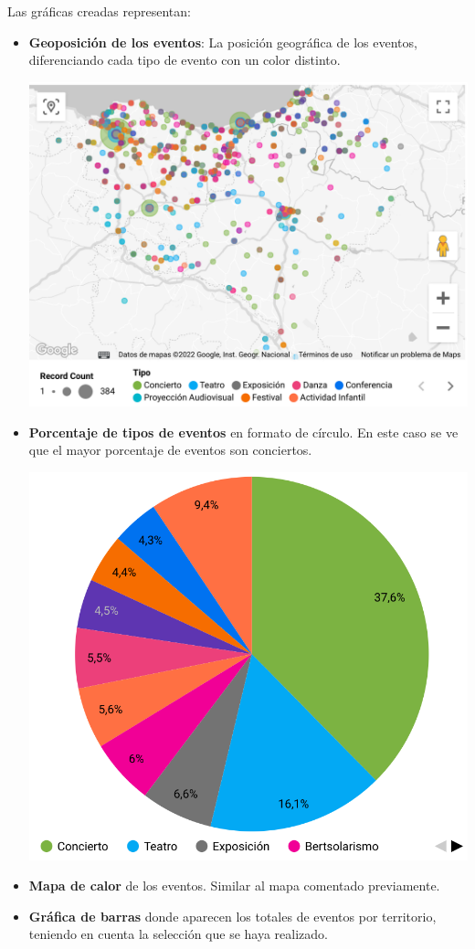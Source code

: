 \documentclass{\ClassPath/viu-tfm-template}
\begin{document}
Las gráficas creadas representan:
\begin{itemize}
    \item \textbf{Geoposición de los eventos}: La posición geográfica de los eventos, diferenciando cada tipo de evento con un color distinto.
    \begin{center}
        \includegraphics[width=0.6\linewidth]{img/mapa1.png}
    \end{center}

    \item \textbf{Porcentaje de tipos de eventos} en formato de círculo. En este caso se ve que el mayor porcentaje de eventos son conciertos.
    \begin{center}
        \includegraphics[width=0.6\linewidth]{img/circulo.png}
    \end{center}

    \item \textbf{Mapa de calor} de los eventos. Similar al mapa comentado previamente.

    \item \textbf{Gráfica de barras} donde aparecen los totales de eventos por territorio, teniendo en cuenta la selección que se haya realizado.
\end{itemize}
\end{document}
